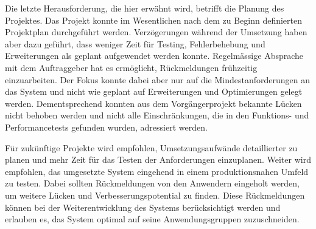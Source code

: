 Die letzte Herausforderung, die hier erwähnt wird, betrifft die Planung des Projektes.
Das Projekt konnte im Wesentlichen nach dem zu Beginn definierten Projektplan durchgeführt werden.
Verzögerungen während der Umsetzung haben aber dazu geführt, dass weniger Zeit für Testing, Fehlerbehebung und Erweiterungen als geplant aufgewendet werden konnte.
Regelmässige Absprache mit dem Auftraggeber hat es ermöglicht, Rückmeldungen frühzeitig einzuarbeiten.
Der Fokus konnte dabei aber nur auf die Mindestanforderungen an das System und nicht wie geplant auf Erweiterungen und Optimierungen gelegt werden.
Dementsprechend konnten aus dem Vorgängerprojekt bekannte Lücken nicht behoben werden und nicht alle Einschränkungen, die in den Funktions- und Performancetests gefunden wurden, adressiert werden.

Für zukünftige Projekte wird empfohlen, Umsetzungsaufwände detaillierter zu planen und mehr Zeit für das Testen der Anforderungen einzuplanen.
Weiter wird empfohlen, das umgesetzte System eingehend in einem produktionsnahen Umfeld zu testen.
Dabei sollten Rückmeldungen von den Anwendern eingeholt werden, um weitere Lücken und Verbesserungspotential zu finden.
Diese Rückmeldungen können bei der Weiterentwicklung des Systems berücksichtigt werden und erlauben es, das System optimal auf seine Anwendungsgruppen zuzuschneiden.

\clearpage

